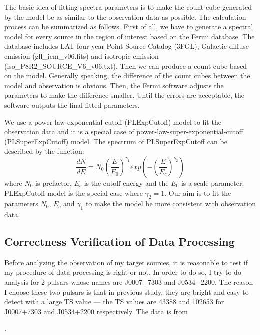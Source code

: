 \documentclass[12pt]{report}
\newcommand{\blackhref}[2]{
  \href{#1}{\color{black}{\textit{\small #2}}}
}
\begin{document}
        The basic idea of fitting spectra parameters is to make the count cube generated by the model be as similar 
        to the observation data as possible. The calculation process can be summarized as follows. First of all, we 
        have to generate a spectral model for every source in the region of interest based on the Fermi database.
        The database includes LAT four-year Point Source Catalog (3FGL), Galactic diffuse emission (gll\_iem\_v06.fits)
        and isotropic emission (iso\_P8R2\_SOURCE\_V6\_v06.txt). 
        Then we can produce a count cube based on the model. Generally speaking, the difference of the 
        count cubes between the model and observation is obvious. Then, the Fermi software adjusts the parameters 
        to make the difference smaller. Until the errors are acceptable, the software outputs the final fitted 
        parameters.  

        We use a power-law-exponential-cutoff (PLExpCutoff) model to fit the observation data and 
        it is a special case of power-law-super-exponential-cutoff (PLSuperExpCutoff) model. 
        The spectrum of PLSuperExpCutoff can be described by the function: 
        \begin{equation} 
          \label{eq: fermi_model}
          \frac{dN}{dE} = N_{0} \left(\frac{E}{E_0}\right)^{\gamma_1} 
          exp\left(-\left(\frac{E}{E_c}\right)^{\gamma_2}\right)
        \end{equation}
        where $N_0$ is prefactor, $E_c$ is the cutoff energy and the $E_0$ is a scale parameter. 
        PLExpCutoff model is the special case where $\gamma_2=1$. Our aim is to fit the parameters 
        $N_0$, $E_c$ and $\gamma_1$ to make the model be more consistent with observation data.

        \subsection{Correctness Verification of Data Processing}
            Before analyzing the observation of my target sources, it is reasonable to test if my procedure of 
            data processing is right or not. In order to do so, I try to do analysis for 
            2 pulsars whose names are J0007+7303 and J0534+2200. The reason I choose these two pulsars 
            is that in previous study, they are bright and easy to detect with a large TS value --- 
            the TS values are 43388 and 102653 for J0007+7303 and J0534+2200 respectively. The data is from 
            \blackhref{https://arxiv.org/abs/1305.4385}{this paper}. 
\end{document}
